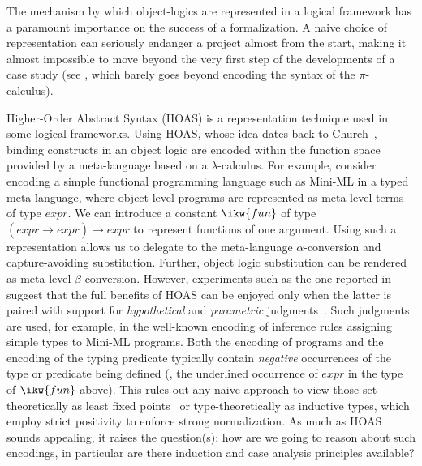 \documentclass[final]{svjour3}
\begin{document}
The mechanism by which object-logics are represented in a logical
framework has a paramount importance on the success of a
formalization. A naive choice of representation can seriously endanger
a project almost from the start, making it almost impossible to move
beyond the very first step of the developments of a case study (see
\cite{Melham94}, which barely goes beyond encoding the syntax of the
$\pi$-calculus).

\renewcommand{\gr}{\ensuremath{\mathit expr}}

Higher-Order Abstract Syntax (HOAS) is a representation technique used
in some logical frameworks.  Using HOAS, whose idea dates back to
Church~\cite{Church40}, binding constructs in an object logic are
encoded within the function space provided by a meta-language based on
a $\lambda$-calculus.  For example, consider encoding a simple
functional programming language such as Mini-ML \cite{Clement86} in a
typed meta-language, where object-level programs are represented as
meta-level terms of type $\gr$.  We can introduce a constant
$\ikw{fun}$ of type $(\underline{\gr} \rightarrow \gr)\rightarrow \gr$
to represent functions of one argument.  Using such a representation
allows us to delegate to the meta-language $\alpha$-conversion and
capture-avoiding substitution.  Further, object logic substitution can
be rendered as meta-level $\beta$-conversion.  However, experiments
such as the one reported in~\cite{Momigliano02lfm} suggest that the
full benefits of HOAS can be enjoyed only when the latter is paired
with support for \emph{hypothetical} and \emph{parametric}
judgments~\cite{MartinLof85,Harper93jacm,Pfenning99handbook}.  Such
judgments are used, for example, in the well-known encoding of
inference rules assigning simple types to Mini-ML programs.  Both the
encoding of programs and the encoding of the typing predicate
typically contain \emph{negative} occurrences of the type or predicate
being defined (\eg, the underlined occurrence of $\gr$ in the type of
$\ikw{fun}$ above).  
This rules out any naive approach to view those set-theoretically as
least fixed points~\cite{GunterwhyMLnot,Paulson94cade}  or
type-theoretically as inductive types, which employ {strict
  positivity} \cite{PaulinMohring93} to enforce strong
normalization.  As much as HOAS sounds appealing, it raises the
question(s): how are we going to reason about such encodings, in
particular are there induction and case analysis principles available?
\end{document}

